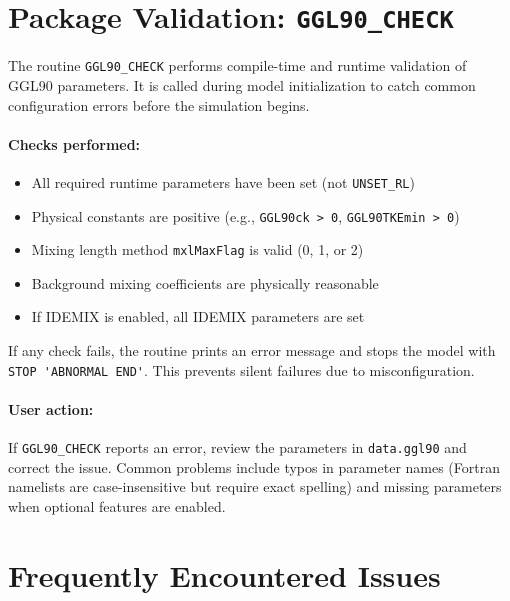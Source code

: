 \documentclass[12pt,letterpaper]{article}
\begin{document}
\section{Package Validation: \texttt{GGL90\_CHECK}}
\label{sec:validation}

The routine \verb|GGL90_CHECK| performs compile-time and runtime validation of GGL90 parameters. It is called during model initialization to catch common configuration errors before the simulation begins.

\paragraph{Checks performed:}
\begin{itemize}
\item All required runtime parameters have been set (not \verb|UNSET_RL|)
\item Physical constants are positive (e.g., \verb|GGL90ck > 0|, \verb|GGL90TKEmin > 0|)
\item Mixing length method \verb|mxlMaxFlag| is valid (0, 1, or 2)
\item Background mixing coefficients are physically reasonable
\item If IDEMIX is enabled, all IDEMIX parameters are set
\end{itemize}

If any check fails, the routine prints an error message and stops the model with \verb|STOP 'ABNORMAL END'|. This prevents silent failures due to misconfiguration.

\paragraph{User action:} If \verb|GGL90_CHECK| reports an error, review the parameters in \verb|data.ggl90| and correct the issue. Common problems include typos in parameter names (Fortran namelists are case-insensitive but require exact spelling) and missing parameters when optional features are enabled.

\section{Frequently Encountered Issues}
\label{sec:issues}
\end{document}
